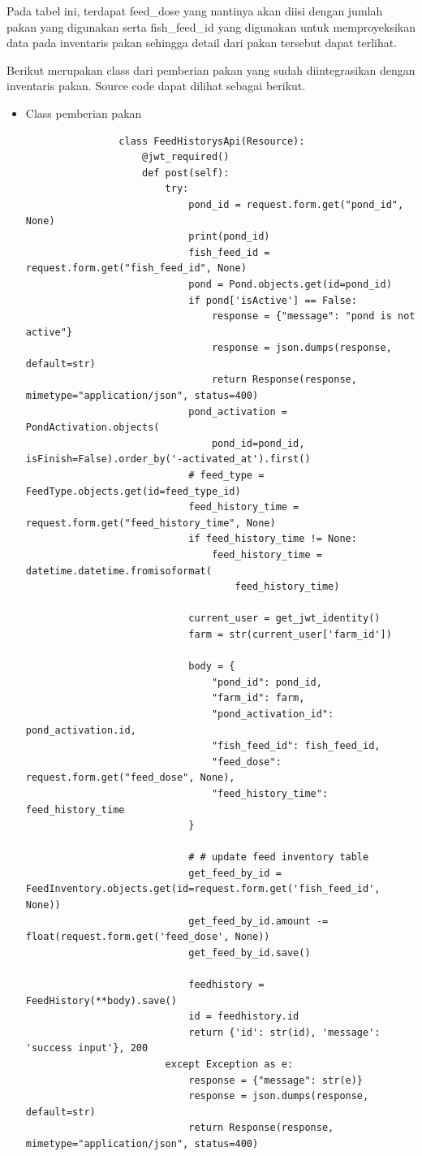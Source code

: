 \begin{spacing}{1.5}
\begin{enumerate}
		Pada tabel ini, terdapat feed\_dose yang nantinya akan diisi dengan jumlah pakan yang digunakan serta fish\_feed\_id yang digunakan untuk memproyeksikan data pada inventaris pakan sehingga detail dari pakan tersebut dapat terlihat.

		Berikut merupakan class dari pemberian pakan yang sudah diintegrasikan dengan inventaris pakan. Source code dapat dilihat sebagai berikut.
		
		\begin{itemize}
			\item Class pemberian pakan
			
			\begin{lstlisting}
				class FeedHistorysApi(Resource):
					@jwt_required()
					def post(self):
						try:
							pond_id = request.form.get("pond_id", None)
							print(pond_id)
							fish_feed_id = request.form.get("fish_feed_id", None)
							pond = Pond.objects.get(id=pond_id)
							if pond['isActive'] == False:
								response = {"message": "pond is not active"}
								response = json.dumps(response, default=str)
								return Response(response, mimetype="application/json", status=400)
							pond_activation = PondActivation.objects(
								pond_id=pond_id, isFinish=False).order_by('-activated_at').first()
							# feed_type = FeedType.objects.get(id=feed_type_id)
							feed_history_time = request.form.get("feed_history_time", None)
							if feed_history_time != None:
								feed_history_time = datetime.datetime.fromisoformat(
									feed_history_time)
								
							current_user = get_jwt_identity()
							farm = str(current_user['farm_id'])
				
							body = {
								"pond_id": pond_id,
								"farm_id": farm,
								"pond_activation_id": pond_activation.id,
								"fish_feed_id": fish_feed_id,
								"feed_dose": request.form.get("feed_dose", None),
								"feed_history_time": feed_history_time
							}
				
							# # update feed inventory table
							get_feed_by_id = FeedInventory.objects.get(id=request.form.get('fish_feed_id', None))
							get_feed_by_id.amount -= float(request.form.get('feed_dose', None))
							get_feed_by_id.save()
				
							feedhistory = FeedHistory(**body).save()
							id = feedhistory.id
							return {'id': str(id), 'message': 'success input'}, 200
						except Exception as e:
							response = {"message": str(e)}
							response = json.dumps(response, default=str)
							return Response(response, mimetype="application/json", status=400)
			\end{lstlisting}
		\end{itemize}


\end{enumerate}
\end{spacing}
